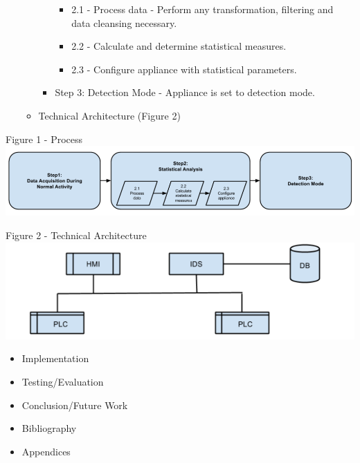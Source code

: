 \documentclass[]{article}
\begin{document}
\begin{itemize}
\begin{itemize}
\begin{itemize}
      \begin{itemize}
      \itemsep1pt\parskip0pt
      \item
        2.1 - Process data - Perform any transformation, filtering and
        data cleansing necessary.
      \item
        2.2 - Calculate and determine statistical measures.
      \item
        2.3 - Configure appliance with statistical parameters.
      \end{itemize}
    \item
      Step 3: Detection Mode - Appliance is set to detection mode.
    \end{itemize}
  \item
    Technical Architecture (Figure 2)
  \end{itemize}
\end{itemize}

Figure 1 -
Process\\\includegraphics{reportOutline_files/figure-latex/unnamed-chunk-2-1.pdf}

Figure 2 - Technical
Architecture\\\includegraphics{reportOutline_files/figure-latex/unnamed-chunk-3-1.pdf}

\begin{itemize}
\item
  Implementation
\item
  Testing/Evaluation
\item
  Conclusion/Future Work
\item
  Bibliography
\item
  Appendices
\end{itemize}
\end{document}
